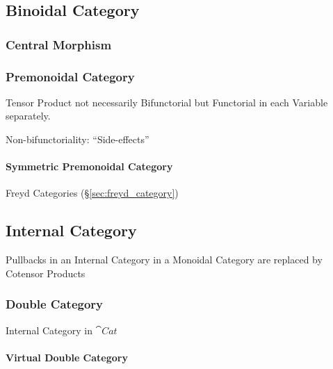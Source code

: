 \subsection{Binoidal Category}\label{sec:binoidal_category}

\subsubsection{Central Morphism}\label{sec:central_morphism}

\subsubsection{Premonoidal Category}\label{sec:premonoidal_category}

Tensor Product not necessarily Bifunctorial but Functorial in each
Variable separately.

Non-bifunctoriality: ``Side-effects'' \cite{jacobs-heunen-hasuo09}



\paragraph{Symmetric Premonoidal Category}
\label{sec:symmetric_premonoidal_category}

Freyd Categories (\S\ref{sec:freyd_category})



\subsection{Internal Category}\label{sec:internal_category}

Pullbacks in an Internal Category in a Monoidal Category are replaced
by Cotensor Products



\subsubsection{Double Category}\label{sec:double_category}

Internal Category in $\cat{Cat}$



\paragraph{Virtual Double Category}\label{sec:virtual_double_category}
\hfill \\

